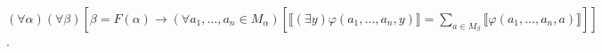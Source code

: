 $(\forall \alpha)(\forall \beta) \left[ \beta = F(\alpha) \rightarrow (\forall a_1, \ldots, a_n \in M_{\alpha}) \left[ \llbracket (\exists y) \varphi(a_1, \ldots, a_n, y) \rrbracket = \sum_{a \in M_{\beta}} \llbracket \varphi(a_1, \ldots, a_n, a) \rrbracket \right] \right]$.
